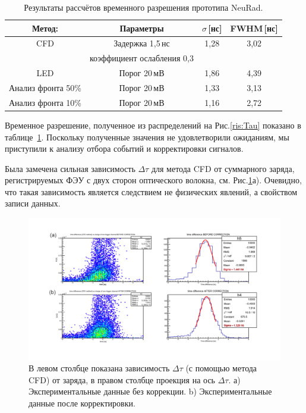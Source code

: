 \begin{table}[!t]
	\centering
	\begin{tabular}{|c|c|c|c|}
		\hline
		\textbf{Метод}: & \textbf{Параметры} & $\sigma$\,[нс] & FWHM\,[нс]\\
		\hline
		CFD & Задержка  1,5\,нс & 1,28 & 3,02 \\
		 & коэффициент ослабления 0,3 &  & \\
		\hline
		LED & Порог 20\,мВ &  1,86 & 4,39\\
		\hline
		Анализ фронта 50\% & Порог 20\,мВ &  1,33 & 3,13\\
		\hline
		Анализ фронта 10\% & Порог 20\,мВ &  1,16 & 2,72\\
		\hline
	\end{tabular}
	\caption{ Результаты рассчётов временного разрешения прототипа NeuRad.}\label{tab:results}
\end{table}

Временное разрешение, полученное из распределений на Рис.\ref{ris:Tau} показано в таблице~\ref{tab:results}. Поскольку полученные значения не удовлетворили ожиданиям, мы приступили к анализу отбора событий и корректировки сигналов. 

Была замечена сильная зависимость $\Delta\tau$ для метода CFD от суммарного заряда, регистрируемых ФЭУ с двух сторон оптического волокна, см. Рис.\ref{ris:walk}а). Очевидно, что такая зависимость является следствием не физических явлений, а свойством записи данных.

\begin{figure}[!ht]
	\centering
	\includegraphics[width=1.0\linewidth]{walkcorr.png}
	\caption{В левом столбце показана зависимость $\Delta\tau$ (с помощью метода CFD) от заряда, в правом столбце проекция на ось $\Delta\tau$. а) Экспериментальные данные без коррекции. b) Экспериментальные данные после корректировки.}
	\label{ris:walk}
\end{figure}

